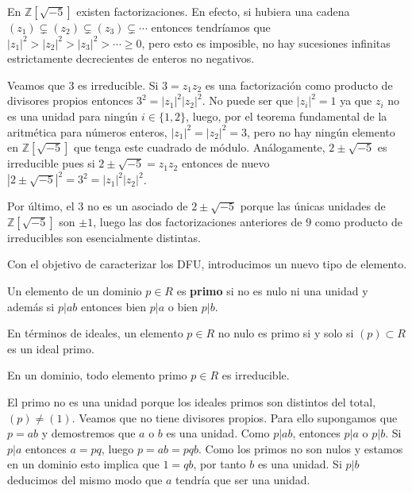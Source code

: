 En \(\mathbb Z[\sqrt{-5}]\) existen factorizaciones. En efecto, si
hubiera una cadena
\((z_1)\subsetneq(z_2)\subsetneq(z_3)\subsetneq\cdots\) entonces
tendríamos que \(|z_1|^2>|z_2|^2>|z_3|^2>\cdots\geq 0\), pero esto es
imposible, no hay sucesiones infinitas estrictamente decrecientes de
enteros no negativos.

Veamos que \(3\) es irreducible. Si \(3=z_1z_2\) es una factorización
como producto de divisores propios entonces \(3^2=|z_1|^2|z_2|^2\). No
puede ser que \(|z_i|^2=1\) ya que \(z_i\) no es una unidad para ningún
\(i\in\{1,2\}\), luego, por el teorema fundamental de la aritmética
para números enteros, \(|z_1|^2=|z_2|^2=3\), pero no hay ningún elemento
en \(\mathbb Z[\sqrt{-5}]\) que tenga este cuadrado de módulo.
Análogamente, \(2\pm\sqrt{-5}\) es irreducible pues si
\(2\pm\sqrt{-5}=z_1z_2\) entonces de nuevo
\(|2\pm\sqrt{-5}|^2=3^2=|z_1|^2|z_2|^2\).

Por último, el \(3\) no es un asociado de \(2\pm\sqrt{-5}\) porque las
únicas unidades de \(\mathbb Z[\sqrt{-5}]\) son \(\pm1\), luego las dos
factorizaciones anteriores de \(9\) como producto de irreducibles son
esencialmente distintas. 

Con el objetivo de caracterizar los DFU, introducimos un nuevo tipo de
elemento.


Un elemento de un dominio \(p\in R\) es \textbf{primo} si no es nulo ni
una unidad y además si \(p|ab\) entonces bien \(p|a\) o bien \(p|b\).


En términos de ideales, un elemento \(p\in R\) no nulo es primo si y
solo si \((p)\subset R\) es un ideal primo. 


En un dominio, todo elemento primo \(p\in R\) es irreducible.


El primo no es una unidad porque los ideales primos son distintos del
total, \((p)\neq (1)\). Veamos que no tiene divisores propios. Para ello
supongamos que \(p=ab\) y demostremos que \(a\) o \(b\) es una unidad.
Como \(p|ab\), entonces \(p|a\) o \(p|b\). Si \(p|a\) entonces \(a=pq\),
luego \(p=ab=pqb\). Como los primos no son nulos y estamos en un dominio
esto implica que \(1=qb\), por tanto \(b\) es una unidad. Si \(p|b\)
deducimos del mismo modo que \(a\) tendría que ser una unidad.


